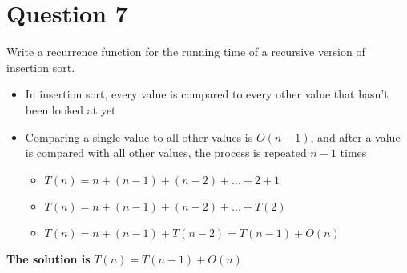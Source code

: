 \documentclass{article}
\begin{document}
    \section{Question 7}
    Write a recurrence function for the running time of a recursive version of insertion sort.
    	\begin{itemize}
    		\item{In insertion sort, every value is compared to every other value that hasn't been looked at yet}
    		\item{Comparing a single value to all other values is $O(n - 1)$, and after a value is compared with all other values, the process is repeated $n-1$ times}
    		\begin{itemize}
	    		\item{$T(n) = n + (n - 1) + (n - 2) + ... + 2 + 1$}
	    		\item{$T(n) = n + (n - 1) + (n-2) + ... + T(2)$}
	    		\item{$T(n) = n + (n - 1) + T(n-2) = T(n-1) + O(n)$}
    		\end{itemize}
		\end{itemize}
    \textbf{The solution is} $T(n) = T(n-1) + O(n)$
\end{document}
